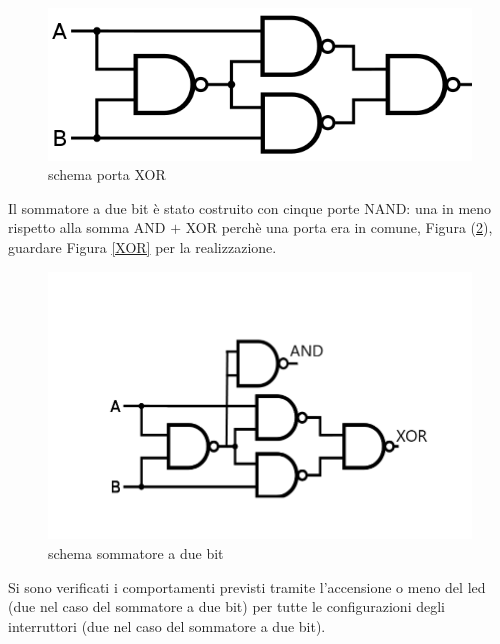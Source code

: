 \documentclass[10pt,a4paper]{article}
\begin{document}
\begin{figure}
	\centering
	\includegraphics[scale=0.55]{xor}
	\caption{schema porta XOR}
	\label{fig:xor}
\end{figure}
Il sommatore a due bit è stato costruito con cinque porte NAND: una in meno rispetto alla somma AND $+$  XOR perchè una porta era in comune, Figura (\ref{fig:som}), guardare Figura \ref{XOR} per la realizzazione.
\begin{figure}
			\centering
			\includegraphics[scale=0.55]{sommatore}
			\caption{schema sommatore a due bit}
			\label{fig:som}
\end{figure}

Si sono verificati i comportamenti  previsti tramite l'accensione o meno del led  (due nel caso del sommatore a due bit) per tutte le configurazioni degli interruttori (due nel caso del sommatore a due bit).
\end{document}
